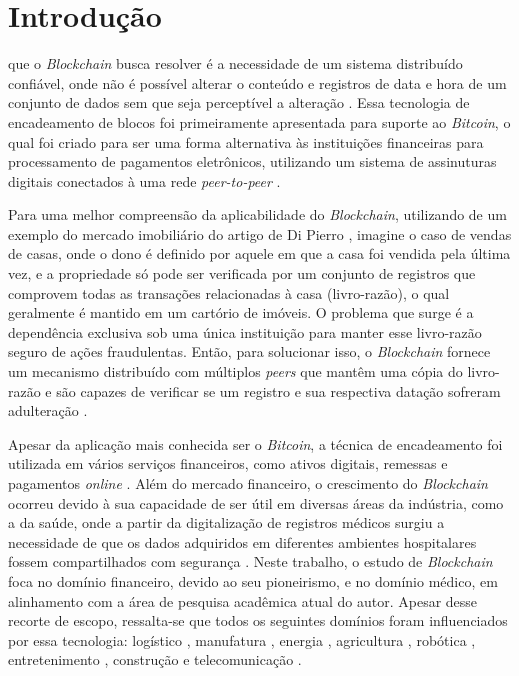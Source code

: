 \section{Introdução}
\label{sec:introducao}


 que o \textit{Blockchain} busca resolver é a necessidade de um sistema distribuído confiável, onde não é possível alterar o conteúdo e registros de data e hora de um conjunto de dados sem que seja perceptível a alteração \cite{di2017blockchain}. Essa tecnologia de encadeamento de blocos foi primeiramente apresentada para suporte ao \textit{Bitcoin}, o qual foi criado para ser uma forma alternativa às instituições financeiras para processamento de pagamentos eletrônicos, utilizando um sistema de assinuturas digitais conectados à uma rede \textit{peer-to-peer} \cite{nakamoto2008bitcoin,rocha2004peer}. 


Para uma melhor compreensão da aplicabilidade do \textit{Blockchain}, utilizando de um exemplo do mercado imobiliário do artigo de Di Pierro \cite{di2017blockchain}, imagine o caso de vendas de casas, onde o dono é definido por aquele em que a casa foi vendida pela última vez, e a propriedade só pode ser verificada por um conjunto de registros que comprovem todas as transações relacionadas à casa (livro-razão), o qual geralmente é mantido em um cartório de imóveis. O problema que surge é a dependência exclusiva sob uma única instituição para manter esse livro-razão seguro de ações fraudulentas. Então, para solucionar isso, o \textit{Blockchain} fornece um mecanismo distribuído com múltiplos \textit{peers} que mantêm uma cópia do livro-razão e são capazes de verificar se um registro e sua respectiva datação sofreram adulteração \cite{di2017blockchain}.


Apesar da aplicação mais conhecida ser o \textit{Bitcoin}, a técnica de encadeamento foi utilizada em vários serviços financeiros, como ativos digitais, remessas e pagamentos \textit{online} \cite{trendsCrypto}. Além do mercado financeiro, o crescimento do \textit{Blockchain} ocorreu devido à sua capacidade de ser útil em diversas áreas da indústria, como a da saúde, onde a partir da digitalização de registros médicos surgiu a necessidade de que os dados adquiridos em diferentes ambientes hospitalares fossem compartilhados com segurança \cite{blockSurvey1,blockMed1}. Neste trabalho, o estudo de \textit{Blockchain} foca no domínio financeiro, devido ao seu pioneirismo, e no domínio médico, em alinhamento com a área de pesquisa acadêmica atual do autor. Apesar desse recorte de escopo, ressalta-se que todos os seguintes domínios foram influenciados por essa tecnologia: logístico \cite{Hackius2017}, manufatura \cite{Barenji2018}, energia \cite{Mengelkamp2018}, agricultura \cite{Lin2017}, robótica \cite{Ferrer2018}, entretenimento \cite{Kalra2018}, construção \cite{Wang2017} e telecomunicação \cite{Ibrahim2017}.

